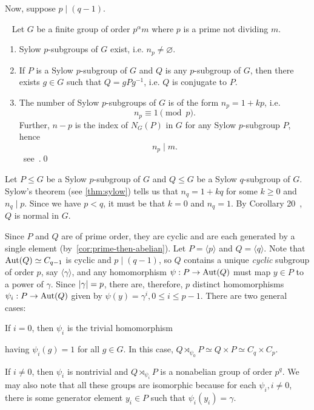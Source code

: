 Now, suppose $p \mid (q-1)$.

\begin{theorem}~\label{thm:sylow}
  Let $G$ be a finite group of order $p^{\alpha}m$ where $p$ is a prime not dividing $m$.
  \begin{enumerate}[label=\arabic{enumi}.]
    \item Sylow $p$-subgroups of $G$ exist, i.e. $n_p \ne \varnothing$.
    \item If $P$ is a Sylow $p$-subgroup of $G$ and $Q$ is any $p$-subgroup of $G$,
      then there exists $g \in G$ such that $Q = gPg^{-1}$, i.e. $Q$ is conjugate to $P$.
    \item The number of Sylow $p$-subgroups of $G$ is of the form
      $n_p = 1 + kp$, i.e. \[ n_p \equiv 1 \pmod p. \]
      Further, $n-p$ is the index of $N_G(P)$ in $G$ for any Sylow $p$-subgroup $P$,
      hence \[ n_p \mid m. \]~see~\cite[Theorem 18,~p.~139]{DummitFoote}.\qed
  \end{enumerate}
  
\end{theorem}

Let $P \le G$ be a Sylow $p$-subgroup of $G$
and $Q \le G$ be a Sylow $q$-subgroup of $G$.
Sylow's theorem (see \ref{thm:sylow}) tells us that
$n_q = 1 + kq$ for some $k \ge 0$ and $n_q \mid p$.
Since we have $p < q$, it must be that $k = 0$ and $n_q = 1$.
By Corollary 20~\cite[p. 142]{DummitFoote}, $Q$ is normal in $G$.


Since $P$ and $Q$ are of prime order, they are cyclic
and are each generated by a single element (by~\ref{cor:prime-then-abelian}).
Let $P = \langle p \rangle$ and $Q = \langle q \rangle$.
Note that $\operatorname{Aut}(Q) \simeq C_{q-1}$ is cyclic and $p \mid (q-1)$,
so $Q$ contains a unique \emph{cyclic} subgroup of order $p$,
say $\langle \gamma \rangle$,
and any homomorphism $\psi : P \to \operatorname{Aut}(Q)$ must map $y \in P$ to a power of $\gamma$.
Since $\lvert\gamma\rvert = p$, there are, therefore, $p$ distinct homomorphisms
$\psi_i : P \to \operatorname{Aut}(Q)$ given by $\psi(y) = \gamma^i, 0 \le i \le p-1$.
There are two general cases:
\begin{enumalph}
  \item If $i = 0$, then $\psi_i$ is the trivial homomorphism
  \item having $\psi_i(g) = 1$ for all $g \in G$. In this case,
    $Q \rtimes_{\psi_0} P \simeq Q \times P \simeq C_q \times C_p$.
  \item If $i \ne 0$, then $\psi_i$ is nontrivial and $Q \rtimes_{\psi_i} P$
    is a nonabelian group of order $p^q$. We may also note that all these groups
    are isomorphic because for each $\psi_i, i \ne 0$, there is some generator
    element $y_i \in P$ such that $\psi_i(y_i) = \gamma$.~\cite[p. 181]{DummitFoote}
    ~\label{case:nontrivial_psi}
\end{enumalph}

